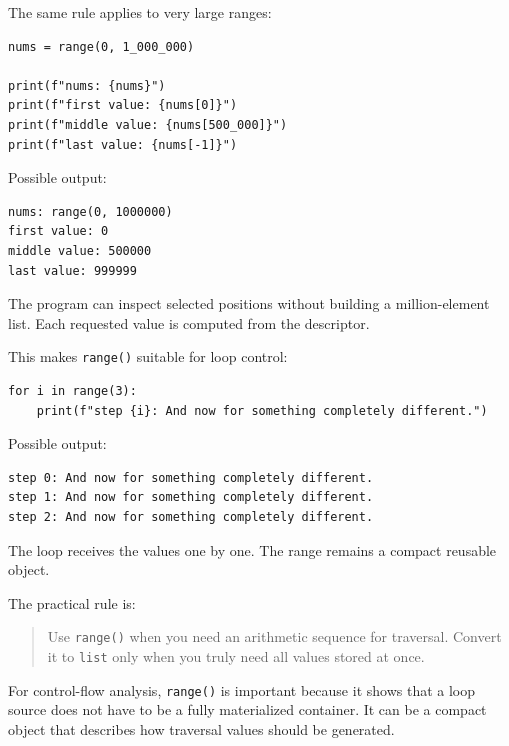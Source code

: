 The same rule applies to very large ranges:

\begin{verbatim}
nums = range(0, 1_000_000)

print(f"nums: {nums}")
print(f"first value: {nums[0]}")
print(f"middle value: {nums[500_000]}")
print(f"last value: {nums[-1]}")
\end{verbatim}

Possible output:

\begin{verbatim}
nums: range(0, 1000000)
first value: 0
middle value: 500000
last value: 999999
\end{verbatim}

The program can inspect selected positions without building a million-element list. Each requested value is computed from the descriptor.

This makes \texttt{range()} suitable for loop control:

\begin{verbatim}
for i in range(3):
    print(f"step {i}: And now for something completely different.")
\end{verbatim}

Possible output:

\begin{verbatim}
step 0: And now for something completely different.
step 1: And now for something completely different.
step 2: And now for something completely different.
\end{verbatim}

The loop receives the values one by one. The range remains a compact reusable object.

The practical rule is:

\begin{quote}
Use \texttt{range()} when you need an arithmetic sequence for traversal. Convert it to \texttt{list} only when you truly need all values stored at once.
\end{quote}

For control-flow analysis, \texttt{range()} is important because it shows that a loop source does not have to be a fully materialized container. It can be a compact object that describes how traversal values should be generated.